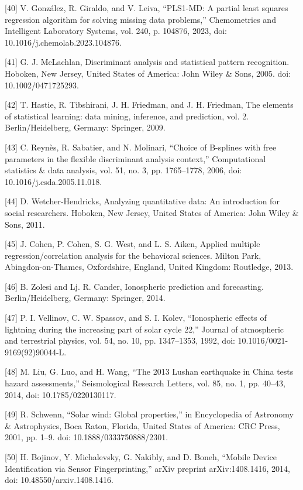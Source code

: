 \let\LaTeXcline\cline\documentclass[sn-mathphys-num]{sn-jnl}\let\cline\LaTeXcline
\begin{document}
[40] V. González, R. Giraldo, and V. Leiva, “PLS1-MD: A partial least squares regression algorithm for solving missing data problems,” Chemometrics and Intelligent Laboratory Systems, vol. 240, p. 104876, 2023, doi: 10.1016/j.chemolab.2023.104876.

[41] G. J. McLachlan, Discriminant analysis and statistical pattern recognition. Hoboken, New Jersey, United States of America: John Wiley & Sons, 2005. doi: 10.1002/0471725293.

[42] T. Hastie, R. Tibshirani, J. H. Friedman, and J. H. Friedman, The elements of statistical learning: data mining, inference, and prediction, vol. 2. Berlin/Heidelberg, Germany: Springer, 2009.

[43] C. Reynès, R. Sabatier, and N. Molinari, “Choice of B-splines with free parameters in the flexible discriminant analysis context,” Computational statistics & data analysis, vol. 51, no. 3, pp. 1765–1778, 2006, doi: 10.1016/j.csda.2005.11.018.

[44] D. Wetcher-Hendricks, Analyzing quantitative data: An introduction for social researchers. Hoboken, New Jersey, United States of America: John Wiley & Sons, 2011.

[45] J. Cohen, P. Cohen, S. G. West, and L. S. Aiken, Applied multiple regression/correlation analysis for the behavioral sciences. Milton Park, Abingdon-on-Thames, Oxfordshire, England, United Kingdom: Routledge, 2013.

[46] B. Zolesi and Lj. R. Cander, Ionospheric prediction and forecasting. Berlin/Heidelberg, Germany: Springer, 2014.

[47] P. I. Vellinov, C. W. Spassov, and S. I. Kolev, “Ionospheric effects of lightning during the increasing part of solar cycle 22,” Journal of atmospheric and terrestrial physics, vol. 54, no. 10, pp. 1347–1353, 1992, doi: 10.1016/0021-9169(92)90044-L.

[48] M. Liu, G. Luo, and H. Wang, “The 2013 Lushan earthquake in China tests hazard assessments,” Seismological Research Letters, vol. 85, no. 1, pp. 40–43, 2014, doi: 10.1785/0220130117.

[49] R. Schwenn, “Solar wind: Global properties,” in Encyclopedia of Astronomy & Astrophysics, Boca Raton, Florida, United States of America: CRC Press, 2001, pp. 1–9. doi: 10.1888/0333750888/2301.

[50] H. Bojinov, Y. Michalevsky, G. Nakibly, and D. Boneh, “Mobile Device Identification via Sensor Fingerprinting,” arXiv preprint arXiv:1408.1416, 2014, doi: 10.48550/arxiv.1408.1416.
\end{document}
